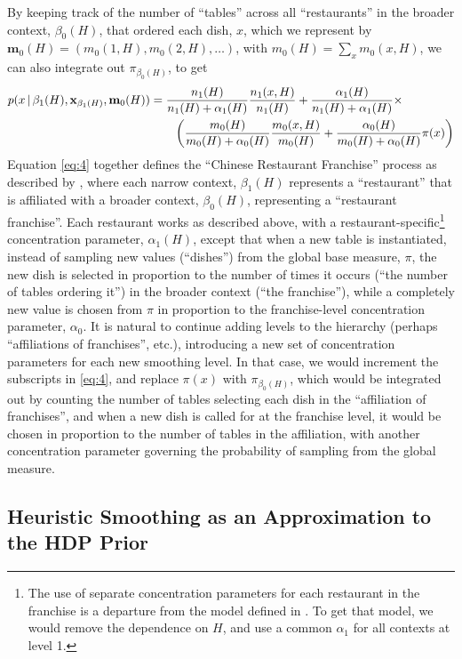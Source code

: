 \documentclass[12pt,letterpaper]{report}
\newcommand{\given}{\, \vert \,}
\newcommand{\bx}{\mathbf{x}}
\newcommand{\bem}{\mathbf{m}}
\begin{document}
By keeping track of the number of ``tables'' across all ``restaurants'' in the
broader context, $\beta_0(H)$, that ordered each dish, $x$, 
which we represent by $\bem_0(H) = (m_0(1,H), m_0(2,H), \dots)$, with
$m_0(H) = \sum_x m_0(x,H)$, we can also integrate out $\pi_{\beta_0(H)}$, to get
\begin{align}
  \label{eq:4}
  p(x \given \beta_1(H), \bx_{\beta_1(H)}, \bem_0(H)) &= \frac{n_1(H)}{n_1(H) +
    \alpha_1(H)} \frac{n_1(x,H)}{n_1(H)} +
  \frac{\alpha_1(H)}{n_1(H) + \alpha_1(H)} \times \\ &\qquad \left(\frac{m_0(H)}{m_0(H)
    + \alpha_0(H)}\frac{m_0(x,H)}{m_0(H)} + \frac{\alpha_0(H)}{m_0(H)
    + \alpha_0(H)} \pi(x)\right) \notag
\end{align}
Equation \eqref{eq:4} together defines
the ``Chinese Restaurant Franchise'' process
as described by \cite{teh2006hierarchical}, where each narrow context,
$\beta_1(H)$ represents a ``restaurant'' that is affiliated with a broader
context, $\beta_0(H)$, representing a ``restaurant franchise''.  Each
restaurant works as described above, with a
restaurant-specific\footnote{The use of separate concentration
  parameters for each restaurant in the franchise is a departure from
  the model defined in \cite{teh2006hierarchical}.  To get that model,
  we would remove the dependence on $H$, and use a common $\alpha_1$
  for all contexts at level 1.}
concentration parameter, $\alpha_1(H)$, except that when a new table
is instantiated, instead of sampling
new values (``dishes'') from the global base measure, $\pi$,
the new dish is selected in proportion to the number of times it occurs
(``the number of tables ordering it'') in the broader context (``the
franchise''), while a completely new value is chosen from $\pi$ in proportion to the
franchise-level concentration parameter, $\alpha_0$.  It is natural to
continue adding levels to the hierarchy (perhaps ``affiliations of
franchises'', etc.), introducing a new set of concentration parameters for
each new smoothing level.  In that case, we would increment the
subscripts in \eqref{eq:4}, and replace $\pi(x)$ with
$\pi_{\beta_0(H)}$, which would be integrated out by counting the
number of tables selecting each dish in the ``affiliation of
franchises'', and when a new dish is called for at the franchise
level, it would be chosen in proportion to the number of tables in the
affiliation, with another concentration parameter governing the
probability of sampling from the global measure.

\subsection{Heuristic Smoothing as an Approximation to the HDP Prior}
\end{document}
